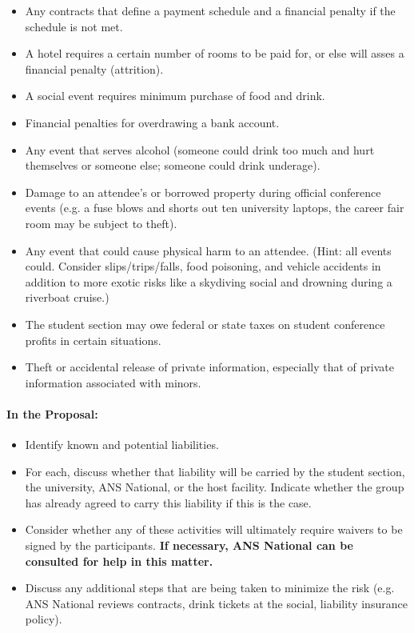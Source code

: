 \documentclass[12pt]{article}
\begin{document}
\begin{itemize}
\item{Any contracts that define a payment schedule and a financial penalty if the schedule is not met.}
\item{A hotel requires a certain number of rooms to be paid for, or else will asses a financial penalty (attrition).}
\item{A social event requires minimum purchase of food and drink.}
\item{Financial penalties for overdrawing a bank account.}
\item{Any event that serves alcohol (someone could drink
too much and hurt themselves or someone else; someone could drink underage).}
\item{Damage to an attendee's or borrowed property during official conference events (e.g. a fuse blows and shorts out ten university laptops, the career fair room may be subject to theft).}
\item{Any event that could cause physical harm to an attendee. (Hint: all events could. Consider slips/trips/falls, food  poisoning, and vehicle accidents in addition to more exotic risks like a skydiving social and drowning during a riverboat cruise.)}
\item{The student section may owe federal or state taxes on student conference profits in certain situations.}
\item{Theft or accidental release of private information, especially that of private information associated with minors.}
\end{itemize}


\paragraph{In the Proposal:}
\begin{itemize}
\item{Identify known and potential liabilities.}
\item{For each, discuss whether that liability will be carried by the student section, the university, ANS National, or the host facility. Indicate whether the group has already agreed to carry this liability if this is the case.}
\item{Consider whether any of these activities will ultimately require waivers to be signed by the participants. \textbf{If necessary, ANS National can be consulted for help in this matter.}}
\item{Discuss any additional steps that are being taken to minimize the risk (e.g. ANS National reviews contracts, drink tickets at the social, liability insurance policy).}
\end{itemize}
\end{document}

